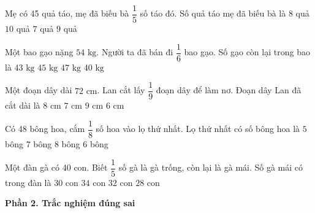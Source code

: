 \begin{ex} %
Mẹ có 45 quả táo, mẹ đã biếu bà $\dfrac{1}{5}$ số táo đó. Số quả táo mẹ đã biếu bà là
\choice
{$8$ quả}
{$10$ quả}
{$7$ quả}
{\True $9$ quả}
\end{ex}

\begin{ex} %
Một bao gạo nặng $54\text{ kg}$. Người ta đã bán đi $\dfrac{1}{6}$ bao gạo. Số gạo còn lại trong bao là
\choice
{$43\text{ kg}$}
{\True $45\text{ kg}$}
{$47\text{ kg}$}
{$40\text{ kg}$}
\end{ex}

\begin{ex} %
Một đoạn dây dài $72\text{ cm}$. Lan cắt lấy $\dfrac{1}{9}$ đoạn dây để làm nơ. Đoạn dây Lan đã cắt dài là
\choice
{\True $8\text{ cm}$}
{$7\text{ cm}$}
{$9\text{ cm}$}
{$6\text{ cm}$}
\end{ex}

\begin{ex} %
Có 48 bông hoa, cắm $\dfrac{1}{8}$ số hoa vào lọ thứ nhất. Lọ thứ nhất có số bông hoa là
\choice
{$5$ bông}
{$7$ bông}
{$8$ bông}
{\True $6$ bông}
\end{ex}

\begin{ex} %
Một đàn gà có 40 con. Biết $\dfrac{1}{5}$ số gà là gà trống, còn lại là gà mái. Số gà mái có trong đàn là
\choice
{$30$ con}
{$34$ con}
{\True $32$ con}
{$28$ con}
\end{ex}

\textbf{Phần 2. Trắc nghiệm đúng sai}

